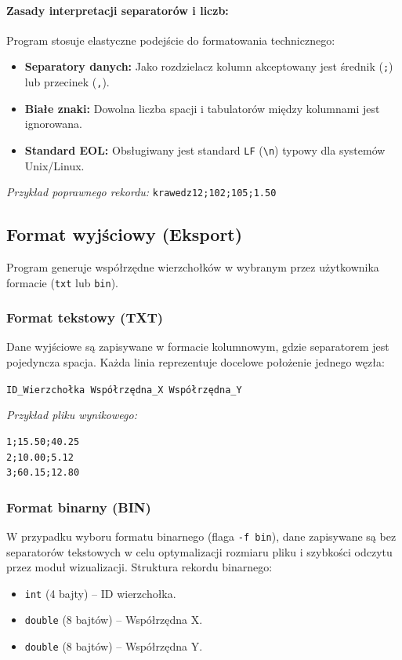 \documentclass[12pt,a4paper]{article}
\begin{document}
\paragraph{Zasady interpretacji separatorów i liczb:}
Program stosuje elastyczne podejście do formatowania technicznego:
\begin{itemize}[label=\textbullet]
    \item \textbf{Separatory danych:} Jako rozdzielacz kolumn akceptowany jest średnik (\texttt{;}) lub przecinek (\texttt{,}).
    \item \textbf{Białe znaki:} Dowolna liczba spacji i tabulatorów między kolumnami jest ignorowana.
    \item \textbf{Standard EOL:} Obsługiwany jest standard \texttt{LF} (\texttt{\textbackslash n}) typowy dla systemów Unix/Linux.
\end{itemize}

\textit{Przykład poprawnego rekordu:} \texttt{krawedz12;102;105;1.50}
\subsection{Format wyjściowy (Eksport)}

Program generuje współrzędne wierzchołków w wybranym przez użytkownika formacie (\texttt{txt} lub \texttt{bin}).

\subsubsection{Format tekstowy (TXT)}
Dane wyjściowe są zapisywane w formacie kolumnowym, gdzie separatorem jest pojedyncza spacja. Każda linia reprezentuje docelowe położenie jednego węzła:
\begin{center}
    \texttt{ID\_Wierzchołka Współrzędna\_X Współrzędna\_Y}
\end{center}

\textit{Przykład pliku wynikowego:}
\begin{verbatim}
1;15.50;40.25
2;10.00;5.12
3;60.15;12.80
\end{verbatim}

\subsubsection{Format binarny (BIN)}
W przypadku wyboru formatu binarnego (flaga \texttt{-f bin}), dane zapisywane są bez separatorów tekstowych w celu optymalizacji rozmiaru pliku i szybkości odczytu przez moduł wizualizacji. Struktura rekordu binarnego:
\begin{itemize}
    \item \texttt{int} (4 bajty) – ID wierzchołka.
    \item \texttt{double} (8 bajtów) – Współrzędna X.
    \item \texttt{double} (8 bajtów) – Współrzędna Y.
\end{itemize}
\end{document}
